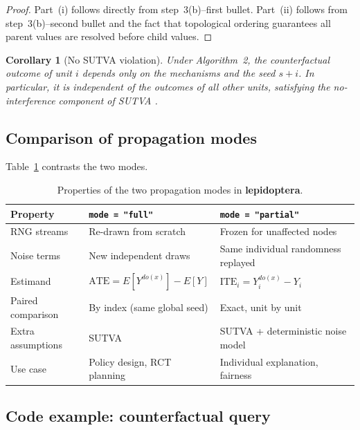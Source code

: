 \documentclass[12pt,a4paper]{article}
\newcommand{\pkg}[1]{\textbf{#1}}
\newcommand{\code}[1]{\texttt{#1}}
\newtheorem{corollary}{Corollary}[section]
\begin{document}
\begin{proof}
Part~(i) follows directly from step~3(b)--first bullet.
Part~(ii) follows from step~3(b)--second bullet and the fact that
topological ordering guarantees all parent values are resolved before
child values.
\end{proof}

\begin{corollary}[No SUTVA violation]
\label{cor:sutva}
Under Algorithm~2, the counterfactual outcome of unit $i$ depends only on the
mechanisms and the seed $s + i$. In particular, it is independent of the outcomes
of all other units, satisfying the no-interference component of SUTVA
\citep{rubin1980randomization}.
\end{corollary}

\subsection{Comparison of propagation modes}
\label{sec:mode_compare}

Table~\ref{tab:modes} contrasts the two modes.

\begin{table}[ht]
\centering
\caption{Properties of the two propagation modes in \pkg{lepidoptera}.}
\label{tab:modes}
\small
\begin{tabular}{lll}
\toprule
Property & \code{mode = "full"} & \code{mode = "partial"} \\
\midrule
RNG streams            & Re-drawn from scratch     & Frozen for unaffected nodes \\
Noise terms            & New independent draws     & Same individual randomness replayed \\
Estimand               & $\mathrm{ATE} = E[Y^{do(x)}] - E[Y]$ & $\mathrm{ITE}_i = Y_i^{do(x)} - Y_i$ \\
Paired comparison      & By index (same global seed) & Exact, unit by unit \\
Extra assumptions      & SUTVA                       & SUTVA + deterministic noise model \\
Use case               & Policy design, RCT planning & Individual explanation, fairness \\
\bottomrule
\end{tabular}
\end{table}

\subsection{Code example: counterfactual query}
\label{sec:cf_code}
\end{document}
